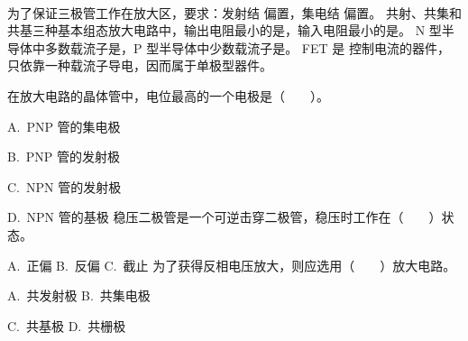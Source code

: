 \documentclass[12pt,a4paper]{exampaper}
\begin{document}

\vspace{0.8em}

\begin{center}
  \hspace{0.4em}%
  \hspace{0.4em}%
  \\[0.4em]
  \hspace{0.4em}%
  \hspace{0.4em}%
\end{center}

\vspace{0.8em}

\examscoretable[3]

\vspace{0.6em}

\begin{examquestions}
  \examquestion 为了保证三极管工作在放大区，要求：发射结\underline{\hspace{1.6cm}} 偏置，集电结\underline{\hspace{1.6cm}} 偏置。
  \examquestion 共射、共集和共基三种基本组态放大电路中，输出电阻最小的是\underline{\hspace{1.6cm}}，输入电阻最小的是\underline{\hspace{1.6cm}}。
  \examquestion N 型半导体中多数载流子是\underline{\hspace{1.6cm}}，P 型半导体中少数载流子是\underline{\hspace{1.6cm}}。
  \examquestion FET 是\underline{\hspace{1.6cm}} 控制电流的器件，只依靠一种载流子导电，因而属于单极型器件。
\end{examquestions}

\vspace{0.6em}

\begin{examquestions}
  \examquestion 在放大电路的晶体管中，电位最高的一个电极是（　　）。

  A.\ PNP 管的集电极

  B.\ PNP 管的发射极

  C.\ NPN 管的发射极

  D.\ NPN 管的基极
  \examquestion 稳压二极管是一个可逆击穿二极管，稳压时工作在（　　）状态。

  A.\ 正偏 \qquad B.\ 反偏 \qquad C.\ 截止
  \examquestion 为了获得反相电压放大，则应选用（　　）放大电路。

  A.\ 共发射极 \qquad B.\ 共集电极

  C.\ 共基极 \qquad D.\ 共栅极
\end{examquestions}
\end{document}
